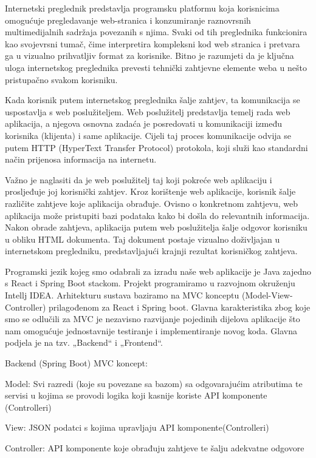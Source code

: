 	Internetski preglednik predstavlja programsku platformu koja korisnicima omogućuje pregledavanje web-stranica i konzumiranje raznovrsnih multimedijalnih sadržaja povezanih s njima. Svaki od tih preglednika funkcionira kao svojevrsni tumač, čime interpretira kompleksni kod web stranica i pretvara ga u vizualno prihvatljiv format za korisnike. Bitno je razumjeti da je ključna uloga internetskog preglednika prevesti tehnički zahtjevne  elemente weba u nešto pristupačno svakom korisniku.
	
	Kada korisnik putem internetskog preglednika šalje zahtjev, ta komunikacija se uspostavlja s web poslužiteljem. Web poslužitelj predstavlja temelj rada web aplikacija, a njegova osnovna zadaća je posredovati u komunikaciji između korisnika (klijenta) i same aplikacije. Cijeli taj proces komunikacije odvija se putem HTTP (HyperText Transfer Protocol) protokola, koji služi kao standardni način prijenosa informacija na internetu.

	Važno je naglasiti da je web poslužitelj taj koji pokreće web aplikaciju i prosljeđuje joj korisnički zahtjev. Kroz korištenje web aplikacije, korisnik šalje različite zahtjeve koje aplikacija obrađuje. Ovisno o konkretnom zahtjevu, web aplikacija može pristupiti bazi podataka kako bi došla do relevantnih informacija. Nakon obrade zahtjeva, aplikacija putem web poslužitelja šalje odgovor korisniku u obliku HTML dokumenta. Taj dokument postaje vizualno doživljajan u internetskom pregledniku, predstavljajući krajnji rezultat korisničkog zahtjeva.
	
	Programski jezik kojeg smo odabrali za izradu naše web aplikacije je Java zajedno s React i Spring Boot stackom. Projekt programiramo u razvojnom okruženju Intellj IDEA. Arhitekturu sustava baziramo na MVC konceptu (Model-View-Controller) prilagođenom za React i Spring boot. Glavna karakteristika zbog koje smo se odlučili za MVC je nezavisno razvijanje pojedinih dijelova aplikacije što nam omogućuje jednostavnije testiranje i implementiranje novog koda. Glavna podjela je na tzv. „Backend“ i „Frontend“.
	\vspace{30pt}
	
	
	Backend (Spring Boot) MVC koncept:
	
	\begin{packed_enum}
	
		\item Model: Svi razredi (koje su povezane sa bazom) sa odgovarajućim atributima te servisi u kojima se provodi logika koji kasnije koriste API komponente (Controlleri)
		\item View: JSON podatci s kojima upravljaju API komponente(Controlleri)
		\item Controller: API komponente koje obrađuju zahtjeve te šalju adekvatne odgovore
							
	\end{packed_enum}
	\eject
	
